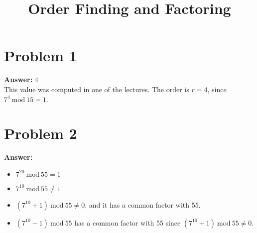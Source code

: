 \documentclass[11pt]{article}
\date{}
\title{Order Finding and Factoring}
\newcommand{\Mod}{\mathrm{mod}\:}
\begin{document}
\thispagestyle{empty}
\pagestyle{empty}
\section*{Problem 1}
\label{sec:org8d0e01e}

\textbf{Answer:} 4\\

This value was computed in one of the lectures. The order is \(r=4\), since
\(7^4\:\Mod 15=1\).
\section*{Problem 2}
\label{sec:org9450469}

\textbf{Answer:}
\begin{itemize}
\item \(7^{20}\:\Mod 55=1\)
\item \(7^{10}\:\Mod 55\neq 1\)
\item \((7^{10}+1)\:\Mod 55\neq 0\), and it has a common factor with 55.
\item \((7^{10}-1)\:\Mod 55\) has a common factor with 55 since
\((7^{10}+1)\:\Mod 55\neq 0\).\\
\end{itemize}
\end{document}
